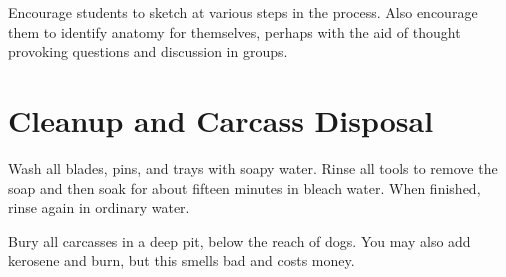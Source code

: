 Encourage students to sketch at various steps in the process. Also encourage them to identify anatomy for themselves, perhaps with the aid of thought provoking questions and discussion in groups.

\section{Cleanup and Carcass Disposal}

Wash all blades, pins, and trays with soapy water. 
Rinse all tools to remove the soap 
and then soak for about fifteen minutes in bleach water. 
When finished, rinse again in ordinary water.

Bury all carcasses in a deep pit, below the reach of dogs. 
You may also add kerosene and burn, 
but this smells bad and costs money.
